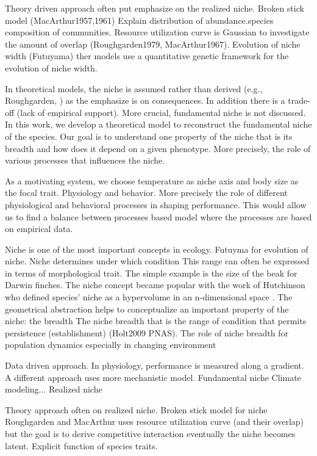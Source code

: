 Theory driven approach often put emphasize on the realized niche.
Broken stick model (MacArthur1957,1961)
Explain distribution of abundance.species composition of communities.
Resource utilization curve is Gaussian to investigate the amount of overlap (Roughgarden1979, MacArthur1967).
Evolution of niche width (Futuyama) ther models use a quantitative genetic framework for the evolution of niche width.

In theoretical models, the niche is assumed rather than derived (e.g., Roughgarden, ) as the emphasize is on consequences.
In addition there is a trade-off (lack of empirical support).
More crucial, fundamental niche is not discussed. 
In this work, we develop a theoretical model to reconstruct the fundamental niche of the species.
Our goal is to understand one property of the niche that is its breadth and how does it depend on a given phenotype.
More precisely, the role of various processes that influences the niche.

As a motivating system, we choose temperature as niche axis and body size as the focal trait. 
Physiology and behavior.
More precisely the role of different physiological and behavioral processes in shaping performance.
This would allow us to find a balance between processes based model where the processes are based on empirical data.
 

 



Niche is one of the most important concepts in ecology.
Futuyma for evolution of niche.
Niche determines under which condition 
This range can often be expressed in terms of morphological trait. 
The simple example is the size of the beak for Darwin finches.
The niche concept became popular with the work of Hutchinson who defined species' niche as a hypervolume in an n-dimensional space \citep{Hutchinson1957}.
The geometrical abstraction helps to conceptualize an important property of the niche: the breadth
The niche breadth that is the range of condition that permits persistence (establishment) (Holt2009 PNAS).
The role of niche breadth for population dynamics especially in changing environment 
      
Data driven approach.
In physiology, performance is measured along a gradient.
A different approach uses more mechanistic model.
Fundamental niche
Climate modeling...
Realized niche

Theory approach often on realized niche.
Broken stick model for niche
Roughgarden and MacArthur uses resource utilization curve (and their overlap) but the goal is to derive competitive interaction eventually the niche becomes latent. 
Explicit function of species traits.    

